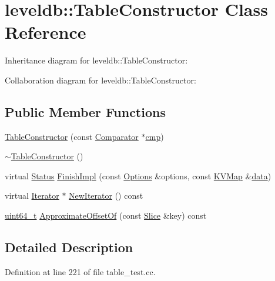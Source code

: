 \hypertarget{classleveldb_1_1_table_constructor}{}\section{leveldb\+:\+:Table\+Constructor Class Reference}
\label{classleveldb_1_1_table_constructor}


Inheritance diagram for leveldb\+:\+:Table\+Constructor\+:


Collaboration diagram for leveldb\+:\+:Table\+Constructor\+:
\subsection*{Public Member Functions}
\begin{DoxyCompactItemize}
\item 
\hyperlink{classleveldb_1_1_table_constructor_acfc791dc15a8fac77f9715fda659eb19}{Table\+Constructor} (const \hyperlink{structleveldb_1_1_comparator}{Comparator} $\ast$\hyperlink{table__test_8cc_a87863e435922f0910ca8db43f02a6c0b}{cmp})
\item 
\hyperlink{classleveldb_1_1_table_constructor_a4be60433281b7d5e6aa37688be8d1631}{$\sim$\+Table\+Constructor} ()
\item 
virtual \hyperlink{classleveldb_1_1_status}{Status} \hyperlink{classleveldb_1_1_table_constructor_aa8ce3799a55859c2dee50d3e08f56ef2}{Finish\+Impl} (const \hyperlink{structleveldb_1_1_options}{Options} \&options, const \hyperlink{namespaceleveldb_aac1e50450147be263e08252c6700f7a7}{K\+V\+Map} \&\hyperlink{classleveldb_1_1_constructor_a55a0363200d6e86d8beb3b15b75e3824}{data})
\item 
virtual \hyperlink{classleveldb_1_1_iterator}{Iterator} $\ast$ \hyperlink{classleveldb_1_1_table_constructor_a4897f3cb58fed2bd3a9f7f6468b6a105}{New\+Iterator} () const 
\item 
\hyperlink{stdint_8h_aaa5d1cd013383c889537491c3cfd9aad}{uint64\+\_\+t} \hyperlink{classleveldb_1_1_table_constructor_a798ee199e8fdc5ec020725dba32a4cb6}{Approximate\+Offset\+Of} (const \hyperlink{classleveldb_1_1_slice}{Slice} \&key) const 
\end{DoxyCompactItemize}


\subsection{Detailed Description}


Definition at line 221 of file table\+\_\+test.\+cc.



